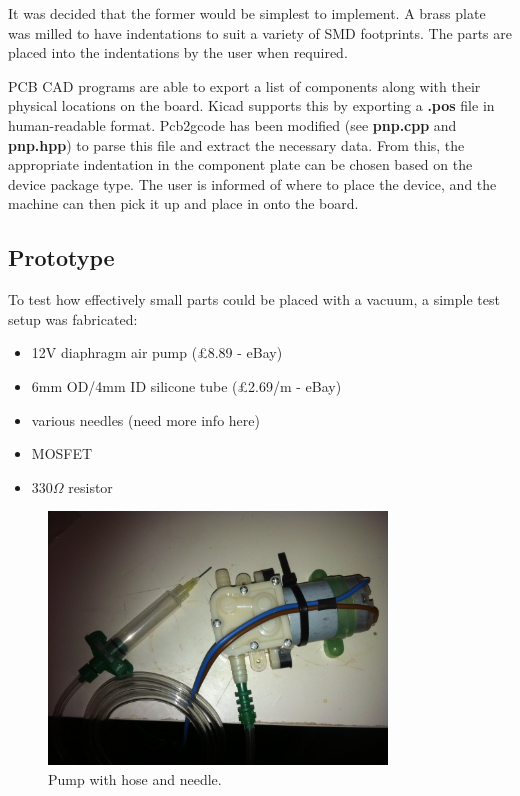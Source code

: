 It was decided that the former would be simplest to implement. A
brass plate was milled to have indentations to suit a variety of SMD
footprints. The parts are placed into the indentations by the user
when required.

PCB CAD programs are able to export a list of components along with their
physical locations on the board. Kicad supports this by exporting a \textbf{.pos}
file in human-readable format. Pcb2gcode has been modified (see \textbf{pnp.cpp}
and \textbf{pnp.hpp}) to parse this file and extract the necessary data.
From this, the appropriate indentation in the component plate can be 
chosen based on the device package type. The user is informed of where
to place the device, and the machine can then pick it up and place in onto
the board.

\subsection{Prototype}
To test how effectively small parts could be placed with a vacuum, a simple test setup was fabricated:

\begin{itemize} \itemsep0em
	\item	12V diaphragm air pump (\pounds 8.89 - eBay)
	\item	6mm OD/4mm ID silicone tube (\pounds 2.69/m - eBay)
	\item	various needles (need more info here)
	\item	MOSFET
	\item	330$\Omega$ resistor
\end{itemize}

\begin{figure}[ht!]
\centering
\includegraphics[width=90mm]{resources/pump_and_hose.jpg}
\caption{Pump with hose and needle.}
\label{hose and needle}
\end{figure}

